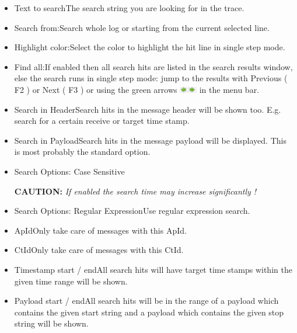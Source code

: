 \documentclass[a4paper,11pt]{article}
\newcommand{\caution}[1]{\begin{ibox} \textbf{CAUTION:} \emph{#1} \end{ibox}}
\begin{document}
\begin{itemize}
 \item Text to search\linebreak The search string you are looking for in the trace.
 \item Search from:\linebreak Search whole log or starting from the current selected line.
 \item Highlight color:\linebreak Select the color to highlight the hit line in single step mode.
 \item Find all:\linebreak If enabled then all search hits are listed in the search results window, else the search runs in single step mode:
 jump to the results with Previous ( F2 ) or Next ( F3 ) or  using the green arrows \includegraphics[width=0.06\textwidth]{images/green_arrows.png} in the menu bar.
 \item Search in Header\linebreak Search hits in the message header will be shown too. E.g. search for a certain receive or target time stamp.
 \item Search in Payload\linebreak Search hits in the message payload will be displayed. This is most probably the standard option.
 \item Search Options: Case Sensitive\linebreak \caution{If enabled the search time may increase significantly !}
 \item Search Options: Regular Expression\linebreak Use regular expression search.
 \item ApId\linebreak Only take care of messages with this ApId.
 \item CtId\linebreak Only take care of messages with this CtId.
 \item Timestamp start / end\linebreak All search hits will have target time stamps within the given time range will be shown.
 \item Payload start / end\linebreak All search hits will be in the range of a payload which contains the given start
     string and a payload which contains the given stop string will be shown.
\end{itemize}
\end{document}
